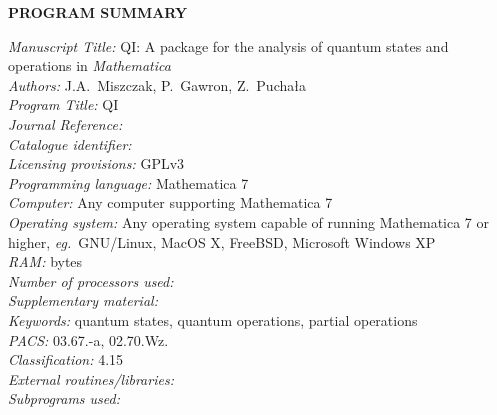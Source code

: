 \documentclass[a4paper,11pt]{elsart}
\newcommand{\Mathematica}{\emph{Mathematica}}
\newcommand{\1}{{\rm 1\hspace{-0.9mm}l}}
\newcommand{\qi}{QI}
\newcommand{\eg}{\emph{eg.}}
\begin{document}
{\bf PROGRAM SUMMARY}

\begin{small}
\noindent
{\em Manuscript Title:} \qi: A package for the analysis of quantum states and operations in
\Mathematica\\
{\em Authors:} J.A.~Miszczak, P.~Gawron, Z.~Pucha{\l}a \\
{\em Program Title:} QI \\
{\em Journal Reference:}                                      \\
{\em Catalogue identifier:}                                   \\
{\em Licensing provisions:} GPLv3 \\
{\em Programming language:} Mathematica 7\\
{\em Computer:} Any computer supporting Mathematica 7\\
{\em Operating system:} Any operating system capable of running Mathematica 7 or higher, \eg\ GNU/Linux, MacOS X, FreeBSD, Microsoft Windows XP\\
{\em RAM:} bytes                                              \\
{\em Number of processors used:}                              \\
{\em Supplementary material:}                                 \\
{\em Keywords:} quantum states, quantum operations, partial operations  \\
{\em PACS:} 03.67.-a, 02.70.Wz.\\
{\em Classification:} 4.15 \\
{\em External routines/libraries:}                                      \\
{\em Subprograms used:}                                       \\


\end{small}
\end{document}
